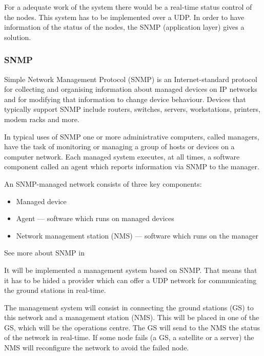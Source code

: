For a adequate work of the system there would be a real-time status control of the nodes. This system has to be implemented over a UDP. In order to have information of the status of the nodes, the SNMP (application layer) gives a solution.

\subsubsection{SNMP}
Simple Network Management Protocol (SNMP) is an Internet-standard protocol for collecting and organising information about managed devices on IP networks and for modifying that information to change device behaviour. Devices that typically support SNMP include routers, switches, servers, workstations, printers, modem racks and more.

In typical uses of SNMP one or more administrative computers, called managers, have the task of monitoring or managing a group of hosts or devices on a computer network. Each managed system executes, at all times, a software component called an agent which reports information via SNMP to the manager.

An SNMP-managed network consists of three key components:
\begin{itemize}
\item Managed device
\item Agent — software which runs on managed devices
\item Network management station (NMS) — software which runs on the manager
\end{itemize}

See more about SNMP in \cite{SNMP}

It will be implemented a management system based on SNMP. That means that it has to be hided a provider which can offer a UDP network for communicating the ground stations in real-time. 

The management system will consist in connecting the ground stations (GS) to this network and a management station (NMS). This will be placed in one of the GS, which will be the operations centre. The GS will send to the NMS the status of the network in real-time. If some node fails (a GS, a satellite or a server) the NMS will reconfigure the network to avoid the failed node. 